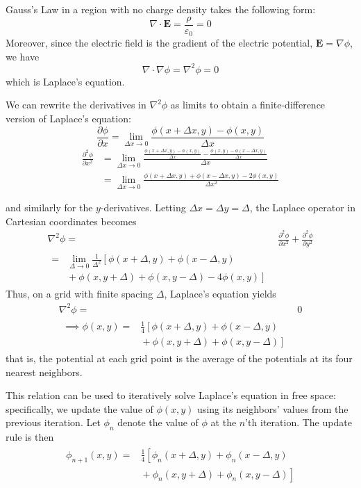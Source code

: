\documentclass[twocolumn,aps,prl]{revtex4-1} %
\newcommand{\pdd}[2]{\frac{\partial #1}{\partial #2}}
\newcommand{\psdd}[2]{\frac{{\partial}^2 #1}{\partial {#2}^2}}
\begin{document}
Gauss's Law in a region with no charge density takes the following form:
$$ \nabla \cdot \mathbf{E} = \frac{\rho}{\varepsilon_0} = 0 $$
\noindent Moreover, since the electric field is the gradient of the electric potential, $\mathbf{E} = \nabla \phi$, we have
$$ \nabla \cdot \nabla \phi = \nabla^2 \phi = 0 $$
\noindent which is Laplace's equation.

We can rewrite the derivatives in $\nabla^2 \phi$ as limits to obtain a finite-difference version of Laplace's equation:
$$ \pdd{\phi}{x} = \lim_{\Delta x \to 0} \frac{\phi(x + \Delta x, y) - \phi(x,y)}{\Delta x} $$
\begin{align*}
	\psdd{\phi}{x}  &=  \lim_{\Delta x \to 0} \frac{\frac{\phi(x + \Delta x, y) - \phi(x,y)}{\Delta x} - \frac{\phi(x, y) - \phi(x - \Delta x,y)}{\Delta x}}{\Delta x} \\ 
	&= \lim_{\Delta x \to 0} \frac{\phi(x + \Delta x, y) + \phi(x - \Delta x, y) - 2\phi(x,y)}{\Delta x^2}
\end{align*}

\noindent and similarly for the $y$-derivatives.  Letting $\Delta x = \Delta y = \Delta$, the Laplace operator in Cartesian coordinates becomes 
\begin{align*}
\nabla^2 \phi ={}& \psdd{\phi}{x} + \psdd{\phi}{y} \\
\begin{split}
    ={}& \lim_{\Delta \to 0} \frac{1}{\Delta^2} \left[\phi(x+\Delta, y) + \phi(x - \Delta, y)\right. \\
         & \left. {} + \phi(x,y+\Delta) + \phi(x,y-\Delta) -4\phi(x,y) \right]
\end{split}
\end{align*}
\noindent Thus, on a grid with finite spacing $\Delta$, Laplace's equation yields
\begin{align*}
\nabla^2 \phi ={}& 0 \\
\begin{split}
   \implies \phi(x,y) ={}& \frac{1}{4} \left[\phi(x+\Delta, y) + \phi(x - \Delta, y)\right. \\
         & \left. {} + \phi(x,y+\Delta) + \phi(x,y-\Delta) \right]
\end{split}
\end{align*}
\noindent that is, the potential at each grid point is the average of the potentials at its four nearest neighbors.

This relation can be used to iteratively solve Laplace's equation in free space: specifically, we update the value of $\phi(x,y)$ using its neighbors' values from the previous iteration.  Let $\phi_n$ denote the value of $\phi$ at the $n$'th iteration.  The update rule is then
\begin{align*}
\begin{split}
   \phi_{n+1}(x,y) ={}& \frac{1}{4} \left[\phi_n(x+\Delta,y) + \phi_n(x-\Delta,y)\right. \\
         & \left. {} + \phi_n(x,y+\Delta) + \phi_n(x,y-\Delta) \right]
\end{split}
\end{align*}
\end{document}
